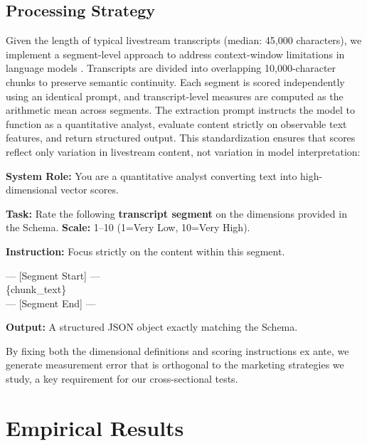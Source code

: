 \documentclass[12pt]{article}
\begin{document}
\subsection{Processing Strategy}
Given the length of typical livestream transcripts (median: 45,000 characters), we implement a segment-level approach to address context-window limitations in language models \citep{liu-etal-2024-lost, pmlr-v202-shi23a}. Transcripts are divided into overlapping 10,000-character chunks to preserve semantic continuity. Each segment is scored independently using an identical prompt, and transcript-level measures are computed as the arithmetic mean across segments.
The extraction prompt instructs the model to function as a quantitative analyst, evaluate content strictly on observable text features, and return structured output. This standardization ensures that scores reflect only variation in livestream content, not variation in model interpretation:
\begin{tcolorbox}[
    title={Prompt: Feature Extraction Instructions},
    breakable,
    colback=gray!5,
    colframe=gray,
    fonttitle=\bfseries,
    left=1mm, right=1mm, top=1mm, bottom=1mm
  ]
  \textbf{System Role:} You are a quantitative analyst converting text into high-dimensional vector scores.
  \vspace{0.5em}
  
  \textbf{Task:} Rate the following \textbf{transcript segment} on the dimensions provided in the Schema.
  \vspace{0.5em}
  \textbf{Scale:} 1--10 (1=Very Low, 10=Very High).
  \vspace{0.5em}
  
  \textbf{Instruction:} Focus strictly on the content within this segment.
  \vspace{0.5em}
  
  --- [Segment Start] --- \\
  \{chunk\_text\} \\
  --- [Segment End] ---
  \vspace{0.5em}
  
  \textbf{Output:} A structured JSON object exactly matching the Schema.
\end{tcolorbox}

By fixing both the dimensional definitions and scoring instructions ex ante, we generate measurement error that is orthogonal to the marketing strategies we study, a key requirement for our cross-sectional tests.


\section{Empirical Results}\label{sec:empirical}
\end{document}
